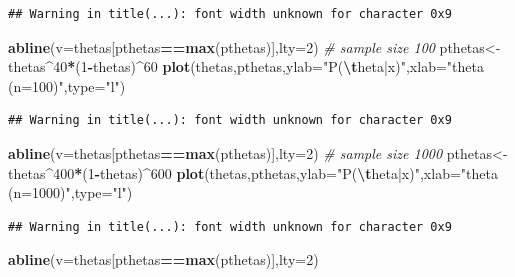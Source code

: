 \documentclass[
]{book}
\newenvironment{Shaded}{\begin{snugshade}}{\end{snugshade}}
\newcommand{\AttributeTok}[1]{\textcolor[rgb]{0.13,0.29,0.53}{#1}}
\newcommand{\CommentTok}[1]{\textcolor[rgb]{0.56,0.35,0.01}{\textit{#1}}}
\newcommand{\DecValTok}[1]{\textcolor[rgb]{0.00,0.00,0.81}{#1}}
\newcommand{\FunctionTok}[1]{\textcolor[rgb]{0.13,0.29,0.53}{\textbf{#1}}}
\newcommand{\NormalTok}[1]{#1}
\newcommand{\OtherTok}[1]{\textcolor[rgb]{0.56,0.35,0.01}{#1}}
\newcommand{\SpecialCharTok}[1]{\textcolor[rgb]{0.81,0.36,0.00}{\textbf{#1}}}
\newcommand{\StringTok}[1]{\textcolor[rgb]{0.31,0.60,0.02}{#1}}
\begin{document}
\begin{verbatim}
## Warning in title(...): font width unknown for character 0x9
\end{verbatim}

\begin{Shaded}
\begin{Highlighting}[]
\FunctionTok{abline}\NormalTok{(}\AttributeTok{v=}\NormalTok{thetas[pthetas}\SpecialCharTok{==}\FunctionTok{max}\NormalTok{(pthetas)],}\AttributeTok{lty=}\DecValTok{2}\NormalTok{)}
\CommentTok{\# sample size 100}
\NormalTok{pthetas}\OtherTok{\textless{}{-}}\NormalTok{thetas}\SpecialCharTok{\^{}}\DecValTok{40}\SpecialCharTok{*}\NormalTok{(}\DecValTok{1}\SpecialCharTok{{-}}\NormalTok{thetas)}\SpecialCharTok{\^{}}\DecValTok{60}
\FunctionTok{plot}\NormalTok{(thetas,pthetas,}\AttributeTok{ylab=}\StringTok{"P(}\SpecialCharTok{\textbackslash{}t}\StringTok{heta|x)"}\NormalTok{,}\AttributeTok{xlab=}\StringTok{"theta  (n=100)"}\NormalTok{,}\AttributeTok{type=}\StringTok{"l"}\NormalTok{)}
\end{Highlighting}
\end{Shaded}

\begin{verbatim}
## Warning in title(...): font width unknown for character 0x9
\end{verbatim}

\begin{Shaded}
\begin{Highlighting}[]
\FunctionTok{abline}\NormalTok{(}\AttributeTok{v=}\NormalTok{thetas[pthetas}\SpecialCharTok{==}\FunctionTok{max}\NormalTok{(pthetas)],}\AttributeTok{lty=}\DecValTok{2}\NormalTok{)}
\CommentTok{\# sample size 1000}
\NormalTok{pthetas}\OtherTok{\textless{}{-}}\NormalTok{thetas}\SpecialCharTok{\^{}}\DecValTok{400}\SpecialCharTok{*}\NormalTok{(}\DecValTok{1}\SpecialCharTok{{-}}\NormalTok{thetas)}\SpecialCharTok{\^{}}\DecValTok{600}
\FunctionTok{plot}\NormalTok{(thetas,pthetas,}\AttributeTok{ylab=}\StringTok{"P(}\SpecialCharTok{\textbackslash{}t}\StringTok{heta|x)"}\NormalTok{,}\AttributeTok{xlab=}\StringTok{"theta  (n=1000)"}\NormalTok{,}\AttributeTok{type=}\StringTok{"l"}\NormalTok{)}
\end{Highlighting}
\end{Shaded}

\begin{verbatim}
## Warning in title(...): font width unknown for character 0x9
\end{verbatim}

\begin{Shaded}
\begin{Highlighting}[]
\FunctionTok{abline}\NormalTok{(}\AttributeTok{v=}\NormalTok{thetas[pthetas}\SpecialCharTok{==}\FunctionTok{max}\NormalTok{(pthetas)],}\AttributeTok{lty=}\DecValTok{2}\NormalTok{)}
\end{Highlighting}
\end{Shaded}
\end{document}
